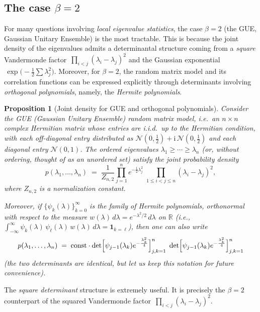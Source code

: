 \documentclass[letterpaper,11pt,oneside,reqno]{article}
\numberwithin{equation}{section}
\newtheorem{proposition}{Proposition}[section]
\theoremstyle{definition}
\begin{document}
\subsection{The case \texorpdfstring{$\beta=2$}{beta=2}}
\label{subsec:beta2-case}

For many questions involving \emph{local eigenvalue statistics}, 
the case \(\beta=2\) (the GUE, Gaussian Unitary Ensemble) is the most tractable.
This is because the joint density of the eigenvalues
admits a determinantal structure coming from
a \emph{square} Vandermonde factor
\(\,\prod_{i<j} (\lambda_i - \lambda_j)^2\)
and the Gaussian exponential
\(\,\exp\bigl(-\tfrac12 \sum \lambda_j^2\bigr)\).
Moreover, for \(\beta=2\), the random matrix model
and its correlation functions 
can be expressed explicitly through determinants involving
\emph{orthogonal polynomials}, namely, the \emph{Hermite polynomials}.

\begin{proposition}[Joint density for GUE and orthogonal polynomials]
  \label{prop:gue-joint-density}
  Consider the GUE (Gaussian Unitary Ensemble) random matrix model, i.e.\ an
  \(n\times n\) complex Hermitian matrix whose entries
  are i.i.d.\ up to the Hermitian condition, with each
  off-diagonal entry distributed as 
  \(\mathcal{N}(0,\tfrac12)+\mathrm{i}\,\mathcal{N}(0,\tfrac12)\)
  and each diagonal entry \(\mathcal{N}(0,1)\).
  The ordered eigenvalues \(\lambda_1 \ge \cdots \ge \lambda_n\) 
  (or, without ordering, thought of as an unordered set)
  satisfy the joint probability density
  \begin{equation}
  	\label{eq:gue-joint-density}
    p(\lambda_1,\ldots,\lambda_n)
    \;=\;
    \frac{1}{Z_{n,2}}
    \prod_{j=1}^n e^{-\frac12 \lambda_j^2}
    \;\prod_{1\le i<j\le n} (\lambda_i - \lambda_j)^2,
  \end{equation}
  where \(Z_{n,2}\) is a normalization constant. 

	Moreover, if 
  \(\{\psi_k(\lambda)\}_{k=0}^\infty\) 
	is the family of Hermite polynomials, orthonormal
  with respect to the measure 
  \(w(\lambda)\,d\lambda = e^{-\lambda^2/2}\,d\lambda\)
  on \(\mathbb{R}\) (i.e., 
	\(\displaystyle\int_{-\infty}^{\infty} \psi_k(\lambda)\,\psi_\ell(\lambda)\,w(\lambda)\,d\lambda = \mathbf{1}_{k=\ell}\)),
  then one can also write
  \begin{equation}
  	\label{eq:gue-joint-OP}
    p(\lambda_1,\ldots,\lambda_n)
    \;=\;
		\mathrm{const}\cdot
		\det\Bigl[\psi_{j-1}(\lambda_k)e^{-\frac{\lambda_k^2}{4}}\Bigr]_{j,k=1}^n
		\;\det\Bigl[\psi_{j-1}(\lambda_k)e^{-\frac{\lambda_k^2}{4}}\Bigr]_{j,k=1}^n
  \end{equation}
	(the two determinants are identical, but let us keep this notation for future convenience).
\end{proposition}
The \emph{square determinant} structure is extremely useful.
It is
precisely the \(\beta=2\) counterpart 
of the squared Vandermonde factor 
\(\,\prod_{i<j}(\lambda_i-\lambda_j)^2\).
\end{document}
